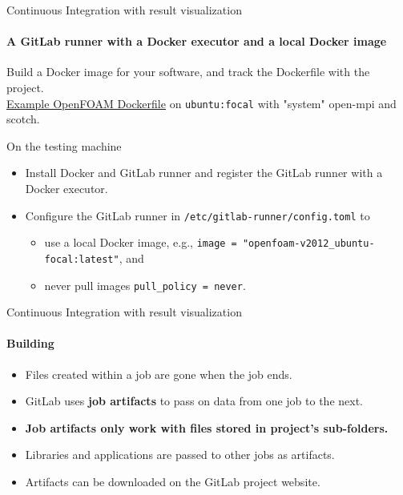 \documentclass[
	aspectratio=169,%
	color={accentcolor=2d},
	logo=true,%
	colorframetitle=true,%
	]{tudabeamer}
\begin{document}
\begin{frame}{Continuous Integration with result visualization} 
    \framesubtitle{A GitLab runner with a Docker executor and a local Docker image}

    \vfill 
    Build a Docker image for your software, and track the Dockerfile with the project.\\
    \medskip
    \href{https://gitlab.com/tmaric/fvc-reconstruct/-/tree/main/docker}{Example OpenFOAM Dockerfile} on \texttt{ubuntu:focal} with "system" open-mpi and scotch.

    \medskip
    On the testing machine
    \begin{itemize}
        \item Install Docker and GitLab runner and register the GitLab runner with a Docker executor.
        \item Configure the GitLab runner in \texttt{/etc/gitlab-runner/config.toml} to
            \begin{itemize}
                \item use a local Docker image, e.g., \texttt{image = "openfoam-v2012\_ubuntu-focal:latest"}, and
                \item never pull images \texttt{pull\_policy = never}.
            \end{itemize}
    \end{itemize}


\end{frame}

\begin{frame}{Continuous Integration with result visualization} 
    \framesubtitle{Building}

    \vfill
    \begin{itemize}
        \item Files created within a job are gone when the job ends. 
        \item GitLab uses \textbf{job artifacts} to pass on data from one job to the next. 
        \item \textbf{Job artifacts only work with files stored in project's sub-folders.} 
        \item Libraries and applications are passed to other jobs as artifacts. 
        \item Artifacts can be downloaded on the GitLab project website.  
    \end{itemize}

\end{frame}
\end{document}
